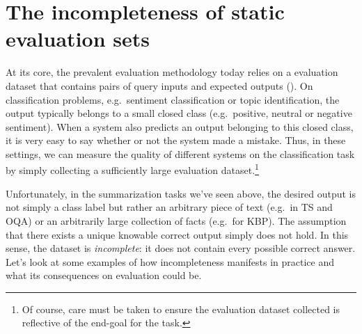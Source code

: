 \section{The incompleteness of static evaluation sets}
At its core, the prevalent evaluation methodology today  relies on a evaluation dataset that contains pairs of query inputs and expected outputs ().
On classification problems, e.g.\ sentiment classification or topic identification, the output typically belongs to a small closed class (e.g.\ positive, neutral or negative sentiment).
When a system also predicts an output belonging to this closed class, it is very easy to say  whether or not the system made a mistake.
Thus, in these settings, we can measure the quality of different systems on the classification task by simply collecting a sufficiently large evaluation dataset.\footnote{%
Of course, care must be taken to ensure the evaluation dataset collected is reflective of the end-goal for the task.}

Unfortunately, in the summarization  tasks we've seen above, the desired output is not simply a class label but rather an arbitrary piece of text (e.g.\ in TS and OQA) or an arbitrarily large collection of facts (e.g.\ for KBP).
The assumption that there exists a unique knowable correct output simply does not hold.
In this sense, the dataset  is \textit{incomplete}: it does not contain every possible correct answer.
Let's look at some examples of how incompleteness manifests in practice and what its consequences on evaluation could be.


